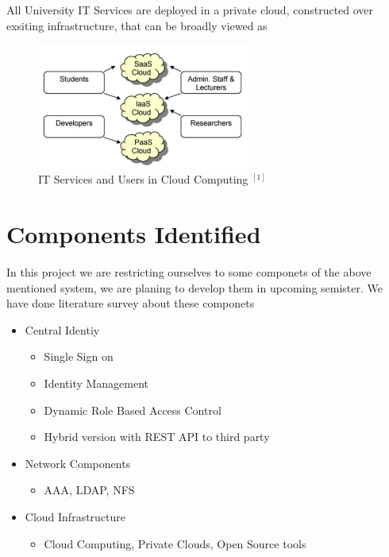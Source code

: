 \documentclass[12pt]{report}
\begin{document}
	All University IT Services are deployed in a private cloud, constructed over exsiting infrastructure, that can be broadly viewed as  
	
\begin{figure}[H]
\begin{center}
\includegraphics[width=7cm]{./it2.png}
\caption{ IT Services and Users in Cloud Computing $ ^{[1]}$ \label{fig:IT Services and Users in Cloud Computing }}
\end{center}
\end{figure}	
	
	
\section{Components Identified}

In this project we are restricting ourselves to some componets of the above mentioned system, we are planing to develop them in upcoming semister. We have done literature survey about these componets

\begin{itemize}
	\item Central Identiy 
	\begin{itemize}
		\item Single Sign on
		\item Identity Management
		\item Dynamic Role Based Access Control
		\item Hybrid version with REST API to third party 
	\end{itemize}
	\item Network Components
	\begin{itemize}
		\item AAA, LDAP, NFS
	\end{itemize}
	\item Cloud Infrastructure
	\begin{itemize}
		\item Cloud Computing, Private Clouds, Open Source tools 
	\end{itemize}
\end{itemize}
\end{document}

